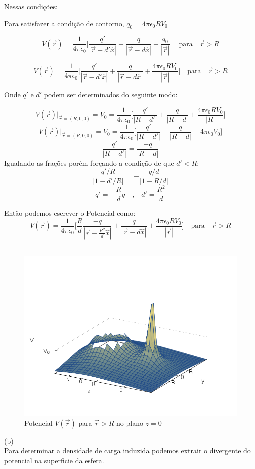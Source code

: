 \documentclass[a4paper,11pt]{exam}
\begin{document}
{	\indent Nessas condições:
		
		Para satisfazer a condição de contorno, $ q_0 = 4 \pi \epsilon_0 R V_0 $
		
	\[ V(\vec{r}) = \frac{1}{ 4 \pi \epsilon_0 } \Bigg[ \frac{q'}{|\vec{r} - d'\hat{x}|} + \frac{q}{|\vec{r} - d\hat{x}|} + \frac{q_0}{|\vec{r}|} \Bigg] \quad \text{para} \quad \vec{r}>R\]
	
	\[ V(\vec{r}) = \frac{1}{ 4 \pi \epsilon_0 } \Bigg[ \frac{q'}{|\vec{r} - d'\hat{x}|} + \frac{q}{|\vec{r} - d\hat{x}|} + \frac{4\pi \epsilon_0 R V_0}{|\vec{r}|} \Bigg] \quad \text{para} \quad \vec{r}>R\]
	
	
	Onde $q'$ e $d'$ podem ser determinados do seguinte modo:
	
	\[ V(\vec{r})\Bigg|_{\vec{r}=(R,0,0)} = V_0 = \frac{1}{ 4 \pi \epsilon_0 } \Bigg[ \frac{q'}{|R - d'|} + \frac{q}{|R - d|} + \frac{4\pi \epsilon_0 R V_0}{|R|} \Bigg] \]
	\[ V(\vec{r})\Bigg|_{\vec{r}=(R,0,0)} = V_0 = \frac{1}{ 4 \pi \epsilon_0 } \Bigg[ \frac{q'}{|R - d'|} + \frac{q}{|R - d|} + 4\pi \epsilon_0 V_0 \Bigg] \]
	\[\frac{q'}{|R - d'|} = \frac{-q}{|R - d|}\]
	Igualando as frações porém forçando a condição de que $d' < R$:
	\[\frac{q'/R}{|1 - d'/R|} = -\frac{q/d}{|1 - R/d|}\]	
	\[q' = -\frac{R}{d}q \quad \text{,} \quad d' = \frac{R^2}{d}\]
	
	Então podemos escrever o Potencial como:
	\[ V(\vec{r}) = \frac{1}{ 4 \pi \epsilon_0 } \Bigg[ \frac{R}{d}\frac{-q}{|\vec{r} - \frac{R^2}{d}\hat{x}|} + \frac{q}{|\vec{r} - d\hat{x}|} + \frac{4\pi \epsilon_0 R V_0}{|\vec{r}|} \Bigg] \quad \text{para} \quad \vec{r}>R\]
	\\
	\begin{figure}[h]
		\centering
		\includegraphics[scale=0.7]{V.png}
		\caption{ Potencial $V(\vec{r})$ para $\vec{r} > R$ no plano $z=0$}
	\end{figure}
	(b)
	\\
	\indent Para determinar a densidade de carga induzida podemos extrair o divergente do potencial na superficie da esfera.
	
}
\end{document}
